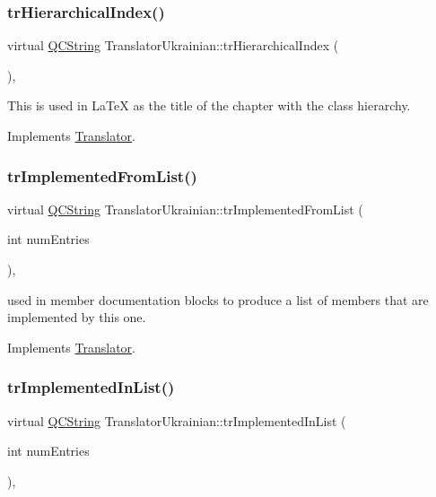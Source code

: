 \subsubsection{\texorpdfstring{trHierarchicalIndex()}{trHierarchicalIndex()}}
{\footnotesize\ttfamily virtual \mbox{\hyperlink{class_q_c_string}{Q\+C\+String}} Translator\+Ukrainian\+::tr\+Hierarchical\+Index (\begin{DoxyParamCaption}{ }\end{DoxyParamCaption})\hspace{0.3cm}{\ttfamily [inline]}, {\ttfamily [virtual]}}

This is used in La\+TeX as the title of the chapter with the class hierarchy. 

Implements \mbox{\hyperlink{class_translator}{Translator}}.

\mbox{\label{class_translator_ukrainian_a544167d4c33c3274f1be0b20f901f8a1}} 
\subsubsection{\texorpdfstring{trImplementedFromList()}{trImplementedFromList()}}
{\footnotesize\ttfamily virtual \mbox{\hyperlink{class_q_c_string}{Q\+C\+String}} Translator\+Ukrainian\+::tr\+Implemented\+From\+List (\begin{DoxyParamCaption}\item[{int}]{num\+Entries }\end{DoxyParamCaption})\hspace{0.3cm}{\ttfamily [inline]}, {\ttfamily [virtual]}}

used in member documentation blocks to produce a list of members that are implemented by this one. 

Implements \mbox{\hyperlink{class_translator}{Translator}}.

\mbox{\label{class_translator_ukrainian_a6b60585c7f42cdcd9de620cf1974f926}} 
\subsubsection{\texorpdfstring{trImplementedInList()}{trImplementedInList()}}
{\footnotesize\ttfamily virtual \mbox{\hyperlink{class_q_c_string}{Q\+C\+String}} Translator\+Ukrainian\+::tr\+Implemented\+In\+List (\begin{DoxyParamCaption}\item[{int}]{num\+Entries }\end{DoxyParamCaption})\hspace{0.3cm}{\ttfamily [inline]}, {\ttfamily [virtual]}}

